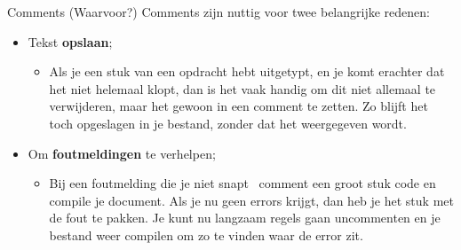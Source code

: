 \begin{frame}[fragile]{Comments (Waarvoor?)}
    Comments zijn nuttig voor twee belangrijke redenen:
    \begin{itemize}[label={\textbullet}]
        \pause 
        \item Tekst \textbf{opslaan};
        \pause 
        \begin{itemize}[label=$\blacktriangleright$]
            \item  Als je een stuk van een opdracht hebt uitgetypt, en je komt erachter dat het niet helemaal klopt, 
                dan is het vaak handig om dit niet allemaal te verwijderen, maar het gewoon in een comment te 
                zetten. Zo blijft het toch opgeslagen in je bestand, zonder dat het weergegeven wordt.
        \end{itemize}
        \pause 
        \item Om \textbf{foutmeldingen} te verhelpen;
        \pause
        \begin{itemize}[label=$\blacktriangleright$]
            \item Bij een foutmelding die je niet snapt \textrightarrow \, comment een groot stuk code 
                en compile je document. Als je nu geen errors krijgt, dan heb je het stuk met de fout te pakken. 
                Je kunt nu langzaam regels gaan uncommenten en je bestand weer compilen om zo te vinden 
                waar de error zit. 
        \end{itemize}
    \end{itemize}
\end{frame}
